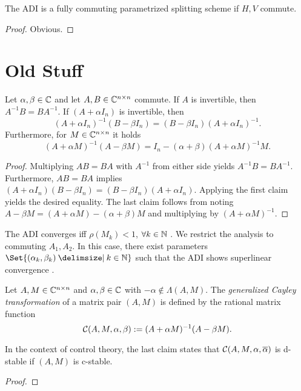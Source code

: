\begin{corollary}
  The ADI is a fully commuting parametrized splitting scheme if $H,V$ commute.
\end{corollary}
\begin{proof}
  Obvious.
\end{proof}

\section{Old Stuff}

\begin{lemma}
\label{thm:adi:commuting-matrices}
  Let $\alpha, \beta\in\mathbb{C}$ and let $A, B \in\mathbb{C}^{n\times n}$ commute.
  If $A$ is invertible, then $A^{-1}B = BA^{-1}$.
  If $(A+\alpha I_n)$ is invertible, then
  \begin{equation*}
    (A+\alpha I_n)^{-1} (B-\beta I_n)
    = (B-\beta I_n) (A+\alpha I_n)^{-1}
    .
  \end{equation*}
  Furthermore, for $M\in\mathbb{C}^{n\times n}$ it holds
  \begin{equation*}
    (A+\alpha M)^{-1} (A-\beta M)
    = I_n - (\alpha+\beta) (A+\alpha M)^{-1} M
    .
  \end{equation*}
\end{lemma}
\begin{proof}
  Multiplying $AB=BA$ with $A^{-1}$ from either side yields $A^{-1}B=BA^{-1}$.
  Furthermore, $AB=BA$ implies
  $
    (A+\alpha I_n) (B-\beta I_n)
    =
    (B-\beta I_n) (A+\alpha I_n)
  $.
  Applying the first claim yields the desired equality.
  The last claim follows from noting
  $A-\beta M = (A+\alpha M) - (\alpha+\beta)M$
  and multiplying by $(A+\alpha M)^{-1}$.
\end{proof}

The \ac{ADI} converges iff $\rho(M_k) < 1$, $\forall k\in\mathbb{N}$ \cite[Theorem~11.2.1]{Golub2013}.
We restrict the analysis to commuting $A_1, A_2$.
In this case,
there exist parameters $\Set{(\alpha_k, \beta_k) \given k\in\N}$
such that the \ac{ADI} shows
superlinear convergence \cite{Beckermann2010}.

\begin{lemma}
\label{thm:adi:cayley}
  Let $A, M\in\mathbb{C}^{n\times n}$ and $\alpha, \beta \in\mathbb{C}$ with $-\alpha\notin\Lambda(A, M)$.
  The \emph{generalized Cayley transformation} of a matrix pair $(A,M)$ is defined by
  the rational matrix function
  \begin{equation*}
    \mathcal{C}(A, M, \alpha, \beta) := (A+\alpha M)^{-1} (A-\beta M).
  \end{equation*}
\end{lemma}
\begin{remark}
  In the context of control theory,
  the last claim states that
  $\Cayley(A, M, \alpha, \conj\alpha)$ is d-stable if
  $(A, M)$ is c-stable.
\end{remark}
\begin{proof}
\end{proof}

